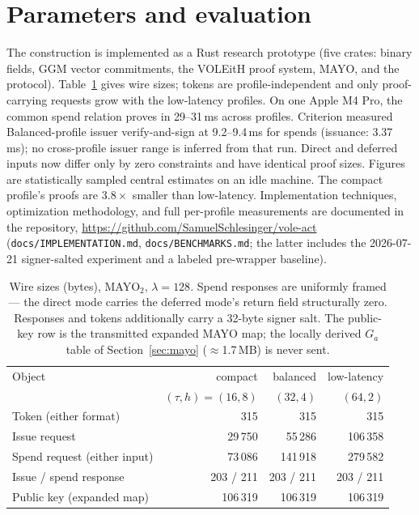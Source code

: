 \documentclass[11pt]{article}
\begin{document}
\section{Parameters and evaluation}
\label{sec:performance}

The construction is implemented as a Rust research prototype (five crates:
binary fields, GGM vector commitments, the VOLEitH proof system, MAYO, and
the protocol). Table~\ref{tab:sizes} gives wire sizes; tokens are
profile-independent and only proof-carrying requests grow with the
low-latency profiles. On one Apple M4 Pro, the common spend relation proves
in 29--31\,ms across profiles. Criterion measured Balanced-profile issuer
verify-and-sign at 9.2--9.4\,ms for spends (issuance: 3.37\,ms); no
cross-profile issuer range is inferred from that run. Direct and deferred
inputs now differ only by zero constraints and have identical proof sizes.
Figures are statistically sampled central estimates on an idle machine. The
compact profile's proofs are $3.8\times$ smaller than low-latency.
Implementation techniques,
optimization methodology, and full per-profile measurements are documented
in the repository,
\url{https://github.com/SamuelSchlesinger/vole-act}
(\texttt{docs/IMPLEMENTATION.md}, \texttt{docs/BENCHMARKS.md}; the latter
includes the 2026-07-21 signer-salted experiment and a labeled pre-wrapper
baseline).

\begin{table}[h]
\centering
\caption{Wire sizes (bytes), MAYO$_2$, $\lambda = 128$. Spend responses
are uniformly framed --- the direct mode carries the deferred mode's
return field structurally zero. Responses and tokens additionally carry a
32-byte signer salt. The
public-key row is the transmitted expanded MAYO map; the locally derived
$G_a$ table of Section~\ref{sec:mayo} ($\approx$1.7\,MB) is never sent.}
\label{tab:sizes}
\begin{tabular}{lrrr}
\toprule
Object & compact & balanced & low-latency \\
& $(\tau,h){=}(16,8)$ & $(32,4)$ & $(64,2)$ \\
\midrule
Token (either format) & 315 & 315 & 315 \\
Issue request & 29\,750 & 55\,286 & 106\,358 \\
Spend request (either input) & 73\,086 & 141\,918 & 279\,582 \\
Issue / spend response & 203 / 211 & 203 / 211 & 203 / 211 \\
Public key (expanded map) & 106\,319 & 106\,319 & 106\,319 \\
\bottomrule
\end{tabular}
\end{table}
\end{document}
